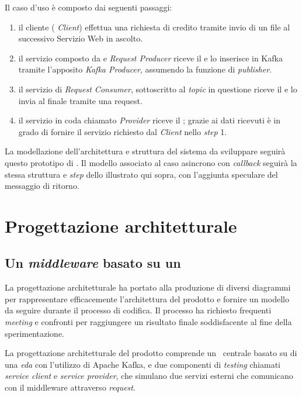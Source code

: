 \noindent
Il caso d'uso è composto dai seguenti passaggi:
\begin{enumerate}
  \item il cliente (\textit{ Client}) effettua una richiesta di credito tramite invio di un file  al successivo Servizio Web in ascolto.
  \item il servizio composto da   e \textit{Request Producer} riceve il  e lo inserisce in Kafka tramite l'apposito \textit{Kafka Producer}, assumendo la funzione di \textit{publisher}.
  \item il servizio di \textit{Request Consumer}, sottoscritto al \textit{topic} in questione riceve il  e lo invia al  finale tramite una  request.
  \item il servizio in coda chiamato  \textit{Provider} riceve il ; grazie ai dati ricevuti è in grado di fornire il servizio richiesto dal \textit{Client} nello \textit{step} 1.
\end{enumerate}

La modellazione dell'architettura e struttura del sistema da sviluppare seguirà questo prototipo di .
Il modello associato al caso asincrono con \textit{callback} seguirà la stessa struttura e \textit{step} dello  illustrato qui sopra, con l'aggiunta speculare del messaggio di ritorno.

\section{Progettazione architetturale}\label{sec:progettazione}
\subsection{Un \textit{middleware} basato su un }

La progettazione architetturale ha portato alla produzione di diversi diagrammi  per rappresentare efficacemente l'architettura del prodotto e fornire un modello da seguire durante il processo di codifica.
Il processo ha richiesto frequenti \textit{meeting} e confronti per raggiungere un risultato finale soddisfacente al fine della sperimentazione.

La progettazione architetturale del prodotto comprende un \middleware\ centrale basato su di una \textit{\acrlong{eda}} con l'utilizzo di Apache Kafka, e due componenti di \textit{testing} chiamati \textit{service client} e \textit{service provider}, che simulano due servizi esterni che comunicano con il middleware attraverso  \textit{request}.

